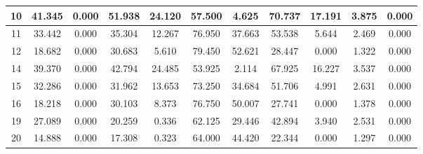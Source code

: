 \begin{table}[]
\begin{tabular}{|c|cc|cc|cc|cc|cc|}
10 & 41.345 & \cellcolor[HTML]{EFEFEF}0.000 & 51.938 & \cellcolor[HTML]{EFEFEF}24.120 & 57.500 & \cellcolor[HTML]{EFEFEF}4.625 & 70.737 & \cellcolor[HTML]{EFEFEF}17.191 & 3.875 & \cellcolor[HTML]{EFEFEF}0.000 \\ \hline
11 & 33.442 & \cellcolor[HTML]{EFEFEF}0.000 & 35.304 & \cellcolor[HTML]{EFEFEF}12.267 & 76.950 & \cellcolor[HTML]{EFEFEF}37.663 & 53.538 & \cellcolor[HTML]{EFEFEF}5.644 & 2.469 & \cellcolor[HTML]{EFEFEF}0.000 \\ \hline
12 & 18.682 & \cellcolor[HTML]{EFEFEF}0.000 & 30.683 & \cellcolor[HTML]{EFEFEF}5.610 & 79.450 & \cellcolor[HTML]{EFEFEF}52.621 & 28.447 & \cellcolor[HTML]{EFEFEF}0.000 & 1.322 & \cellcolor[HTML]{EFEFEF}0.000 \\ \hline
14 & 39.370 & \cellcolor[HTML]{EFEFEF}0.000 & 42.794 & \cellcolor[HTML]{EFEFEF}24.485 & 53.925 & \cellcolor[HTML]{EFEFEF}2.114 & 67.925 & \cellcolor[HTML]{EFEFEF}16.227 & 3.537 & \cellcolor[HTML]{EFEFEF}0.000 \\ \hline
15 & 32.286 & \cellcolor[HTML]{EFEFEF}0.000 & 31.962 & \cellcolor[HTML]{EFEFEF}13.653 & 73.250 & \cellcolor[HTML]{EFEFEF}34.684 & 51.706 & \cellcolor[HTML]{EFEFEF}4.991 & 2.631 & \cellcolor[HTML]{EFEFEF}0.000 \\ \hline
16 & 18.218 & \cellcolor[HTML]{EFEFEF}0.000 & 30.103 & \cellcolor[HTML]{EFEFEF}8.373 & 76.750 & \cellcolor[HTML]{EFEFEF}50.007 & 27.741 & \cellcolor[HTML]{EFEFEF}0.000 & 1.378 & \cellcolor[HTML]{EFEFEF}0.000 \\ \hline
19 & 27.089 & \cellcolor[HTML]{EFEFEF}0.000 & 20.259 & \cellcolor[HTML]{EFEFEF}0.336 & 62.125 & \cellcolor[HTML]{EFEFEF}29.446 & 42.894 & \cellcolor[HTML]{EFEFEF}3.940 & 2.531 & \cellcolor[HTML]{EFEFEF}0.000 \\ \hline
20 & 14.888 & \cellcolor[HTML]{EFEFEF}0.000 & 17.308 & \cellcolor[HTML]{EFEFEF}0.323 & 64.000 & \cellcolor[HTML]{EFEFEF}44.420 & 22.344 & \cellcolor[HTML]{EFEFEF}0.000 & 1.297 & \cellcolor[HTML]{EFEFEF}0.000 \\ \hline
\end{tabular}
\end{table}
